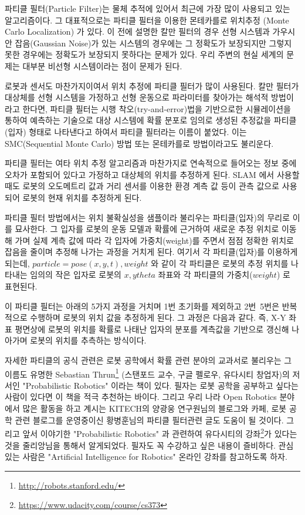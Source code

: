 파티클 필터(Particle Filter)는 물체 추적에 있어서 최근에 가장 많이 사용되고 있는 알고리즘이다. 그 대표적으로는 파티클 필터을 이용한 몬테카를로 위치추정 (Monte Carlo Localization) 가 있다. 이 전에 설명한 칼만 필터의 경우 선형 시스템과 가우시안 잡음(Gaussian Noise)가 있는 시스템의 경우에는 그 정확도가 보장되지만 그렇지 못한 경우에는 정확도가 보장되지 못하다는 문제가 있다. 우리 주변의 현실 세계의 문제는 대부분 비선형 시스템이라는 점이 문제가 된다.

로봇과 센서도 마찬가지이여서 위치 추정에 파티클 필터가 많이 사용된다. 칼만 필터가 대상체를 선형 시스템을 가정하고 선형 운동으로 파라미터를 찾아가는 해석적 방법이라고 한다면, 파티클 필터는 시행 착오(try-and-error)법을 기반으로한 시뮬레이션을 통하여 예측하는 기술으로 대상 시스템에 확률 분포로 임의로 생성된 추정값을 파티클(입자) 형태로 나타낸다고 하여서 파티클 필터라는 이름이 붙었다. 이는 SMC(Sequential Monte Carlo) 방법 또는 몬테카를로 방법이라고도 불리운다.

파티클 필터는 여타 위치 추정 알고리즘과 마찬가지로 연속적으로 들어오는 정보 중에 오차가 포함되어 있다고 가정하고 대상체의 위치를 추정하게 된다. SLAM 에서 사용할 때도 로봇의 오도메트리 값과 거리 센서를 이용한 환경 계측 값 등이 관측 값으로 사용되어 로봇의 현재 위치를 추정하게 된다. 

파티클 필터 방법에서는 위치 불확실성을 샘플이라 불리우는 파티클(입자)의 무리로 이를 묘사한다. 그 입자를 로봇의 운동 모델과 확률에 근거하여 새로운 추정 위치로 이동해 가며 실제 계측 값에 따라 각 입자에 가중치(weight)를 주면서 점점 정확한 위치로 잡음을 줄이며 추정해 나가는 과정을 거치게 된다. 여기서 각 파티클(입자)를 이용하게 되는데, $particle = pose(x,y,t), weight$ 와 같이 각 파티클은 로봇의 추정 위치를 나타내는 임의의 작은 입자로 로봇의 $x, y theta$ 좌표와 각 파티클의 가중치($weight$) 로 표현된다. 

이 파티클 필터는 아래의 5가지 과정을 거치며 1번 초기화를 제외하고 2번~5번은 반복적으로 수행하며 로봇의 위치 값을 추정하게 된다. 그 과정은 다음과 같다. 즉, X-Y 좌표 평면상에 로봇의 위치를 확률로 나태난 입자의 분포를 계측값을 기반으로 갱신해 나아가며 로봇의 위치를 추측하는 방식이다. 

자세한 파티클의 공식 관련은 로봇 공학에서 확률 관련 분야의 교과서로 불리우는 그 이름도 유명한 Sebastian Thrun\footnote{\url{http://robots.stanford.edu/}} (스탠포드 교수, 구글 펠로우, 유다시티 창업자)의 저서인 "Probabilistic Robotics"\cite{thrun2005probabilistic} 이라는 책이 있다. 필자는 로봇 공학을 공부하고 싶다는 사람이 있다면 이 책을 적극 추천하는 바이다. 그리고 우리 나라 Open Robotics 분야에서 많은 활동을 하고 계시는 KITECH의 양광웅 연구원님의 블로그와 카페,  로봇 공학 관련 블로그를 운영중이신 황병훈님의 파티클 필터관련 글도 도움이 될 것이다. 그리고 앞서 이야기한 "Probabilistic Robotics" 과 관련하여 유다시티의 강좌\footnote{\url{https://www.udacity.com/course/cs373}}가 있다는 것을 줄리앙님을 통해서 알게되었다. 필자도 꼭 수강하고 싶은 내용이 즐비하다. 관심 있는 사람은 "Artificial Intelligence for Robotics" 온라인 강좌를 참고하도록 하자.


